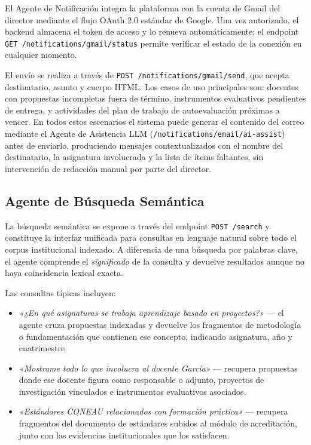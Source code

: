 El Agente de Notificación integra la plataforma con la cuenta de Gmail del
director mediante el flujo OAuth 2.0 estándar de Google.
Una vez autorizado, el backend almacena el token de acceso y lo renueva
automáticamente; el endpoint \texttt{GET /notifications/gmail/status}
permite verificar el estado de la conexión en cualquier momento.

El envío se realiza a través de \texttt{POST /notifications/gmail/send},
que acepta destinatario, asunto y cuerpo HTML.
Los casos de uso principales son: docentes con propuestas incompletas fuera
de término, instrumentos evaluativos pendientes de entrega, y actividades
del plan de trabajo de autoevaluación próximas a vencer.
En todos estos escenarios el sistema puede generar el contenido del correo
mediante el Agente de Asistencia LLM (\texttt{/notifications/email/ai-assist})
antes de enviarlo, produciendo mensajes contextualizados con el nombre del
destinatario, la asignatura involucrada y la lista de ítems faltantes, sin
intervención de redacción manual por parte del director.

\subsection{Agente de Búsqueda Semántica}
\label{subsec:agente_busqueda}

La búsqueda semántica se expone a través del endpoint
\texttt{POST /search} y constituye la interfaz unificada para consultas
en lenguaje natural sobre todo el corpus institucional indexado.
A diferencia de una búsqueda por palabras clave, el agente comprende el
\emph{significado} de la consulta y devuelve resultados aunque no haya
coincidencia lexical exacta.

Las consultas típicas incluyen:
\begin{itemize}[noitemsep]
  \item \textit{«¿En qué asignaturas se trabaja aprendizaje basado en
    proyectos?»} — el agente cruza propuestas indexadas y devuelve los
    fragmentos de metodología o fundamentación que contienen ese concepto,
    indicando asignatura, año y cuatrimestre.
  \item \textit{«Mostrame todo lo que involucra al docente García»} —
    recupera propuestas donde ese docente figura como responsable o adjunto,
    proyectos de investigación vinculados e instrumentos evaluativos
    asociados.
  \item \textit{«Estándares CONEAU relacionados con formación práctica»} —
    recupera fragmentos del documento de estándares subidos al módulo de
    acreditación, junto con las evidencias institucionales que los
    satisfacen.
\end{itemize}

